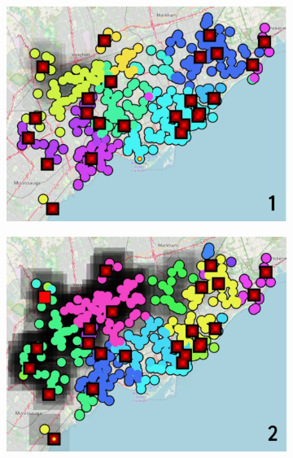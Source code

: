 \begin{figure}[t]
  \begin{subfigure}[b]{0.49\linewidth}
    \centering
    \includegraphics[width=\linewidth]{papers/ieee2022/img/snapshots/step-1.png-low.png}
  \end{subfigure}
  \hfill
  \begin{subfigure}[b]{0.49\linewidth}
    \centering
    \includegraphics[width=\linewidth]{papers/ieee2022/img/snapshots/step-3.png-low.png}
  \end{subfigure}
  \\[0.15cm]
  \begin{subfigure}[b]{0.49\linewidth}
    \centering

\end{subfigure}
\end{figure}
